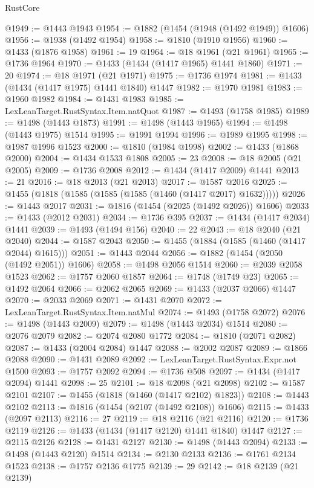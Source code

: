 \begin{lexlean}{RustCore}
\begin{coremodule}
@1949 := @1443 @1943
@1954 := @1882 (@1454 (@1948 (@1492 @1949)) @1606)
@1956 := @1938 (@1492 @1954)
@1958 := @1810 (@1910 @1956)
@1960 := @1433 (@1876 @1958)
@1961 := 19
@1964 := @18 @1961 (@21 @1961)
@1965 := @1736 @1964
@1970 := @1433 (@1434 (@1417 @1965) @1441 @1860)
@1971 := 20
@1974 := @18 @1971 (@21 @1971)
@1975 := @1736 @1974
@1981 := @1433 (@1434 (@1417 @1975) @1441 @1840) @1447
@1982 := @1970 @1981
@1983 := @1960 @1982
@1984 := @1431 @1983
@1985 := LexLeanTarget.RustSyntax.Item.natQuot
@1987 := @1493 (@1758 @1985)
@1989 := @1498 (@1443 @1873)
@1991 := @1498 (@1443 @1965)
@1994 := @1498 (@1443 @1975) @1514
@1995 := @1991 @1994
@1996 := @1989 @1995
@1998 := @1987 @1996 @1523
@2000 := @1810 (@1984 @1998)
@2002 := @1433 (@1868 @2000)
@2004 := @1434 @1533 @1808
@2005 := 23
@2008 := @18 @2005 (@21 @2005)
@2009 := @1736 @2008
@2012 := @1434 (@1417 @2009) @1441
@2013 := 21
@2016 := @18 @2013 (@21 @2013)
@2017 := @1587 @2016
@2025 := @1455 (@1818 (@1585 (@1585 (@1585 (@1460 (@1417 @2017) @1632)))))
@2026 := @1443 @2017
@2031 := @1816 (@1454 (@2025 (@1492 @2026)) @1606)
@2033 := @1433 (@2012 @2031)
@2034 := @1736 @395
@2037 := @1434 (@1417 @2034) @1441
@2039 := @1493 (@1494 @156)
@2040 := 22
@2043 := @18 @2040 (@21 @2040)
@2044 := @1587 @2043
@2050 := @1455 (@1884 (@1585 (@1460 (@1417 @2044) @1615)))
@2051 := @1443 @2044
@2056 := @1882 (@1454 (@2050 (@1492 @2051)) @1606)
@2058 := @1498 @2056 @1514
@2060 := @2039 @2058 @1523
@2062 := @1757 @2060 @1857
@2064 := @1748 (@1749 @23)
@2065 := @1492 @2064
@2066 := @2062 @2065
@2069 := @1433 (@2037 @2066) @1447
@2070 := @2033 @2069
@2071 := @1431 @2070
@2072 := LexLeanTarget.RustSyntax.Item.natMul
@2074 := @1493 (@1758 @2072)
@2076 := @1498 (@1443 @2009)
@2079 := @1498 (@1443 @2034) @1514
@2080 := @2076 @2079
@2082 := @2074 @2080 @1772
@2084 := @1810 (@2071 @2082)
@2087 := @1433 (@2004 @2084) @1447
@2088 := @2002 @2087
@2089 := @1866 @2088
@2090 := @1431 @2089
@2092 := LexLeanTarget.RustSyntax.Expr.not @1500
@2093 := @1757 @2092
@2094 := @1736 @508
@2097 := @1434 (@1417 @2094) @1441
@2098 := 25
@2101 := @18 @2098 (@21 @2098)
@2102 := @1587 @2101
@2107 := @1455 (@1818 (@1460 (@1417 @2102) @1823))
@2108 := @1443 @2102
@2113 := @1816 (@1454 (@2107 (@1492 @2108)) @1606)
@2115 := @1433 (@2097 @2113)
@2116 := 27
@2119 := @18 @2116 (@21 @2116)
@2120 := @1736 @2119
@2126 := @1433 (@1434 (@1417 @2120) @1441 @1840) @1447
@2127 := @2115 @2126
@2128 := @1431 @2127
@2130 := @1498 (@1443 @2094)
@2133 := @1498 (@1443 @2120) @1514
@2134 := @2130 @2133
@2136 := @1761 @2134 @1523
@2138 := @1757 @2136 @1775
@2139 := 29
@2142 := @18 @2139 (@21 @2139)

\end{coremodule}
\end{lexlean}
